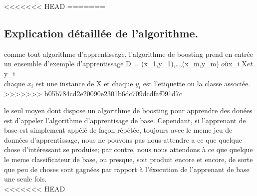 \documentclass[french,a4paper,12pt]{article}
\begin{document}
\begin{algorithm}
\begin{algorithmic}


    
    
\end{algorithmic}
\end{algorithm}
<<<<<<< HEAD
=======

\subsection{Explication détaillée de l'algorithme.}\citep{schapire}



\quad comme tout algorithme d'apprentissage, l'algorithme de boosting prend en entrée un ensemble d'exemple d'apprentissage  D = {(x_1,y_1),\ldots,(x_m,y_m)} $ où $x_i \in X$ et  $y_i  \in [{-1,+1}]\\



\quad chaque $x_i$ est une instance de X  et chaque $y_i$ est l'etiquette ou la classe  associée. 
>>>>>>> b05b784cd2e20090e2301b6dc709dcdfaf091d7c




\quad le seul moyen dont dispose un algorithme de boosting pour apprendre des donées est d'appeler l'algorithme d'apprentisage de base. Cependant, si l'apprenant de base est simplement appélé de façon répétée, toujours avec le meme jeu de données d'apprentissage, nous ne pouvons pas nous attendre a ce que quelque chose d'intéressant se produise; par contre, nous nous attendons à ce que quelque le meme classificateur de base, ou presque, soit produit encore et encore, de sorte que peu de choses sont gagnées par rapport à l'éxecution de l'apprenant de base une seule fois.\\ 


<<<<<<< HEAD
\newpage
\end{document}
